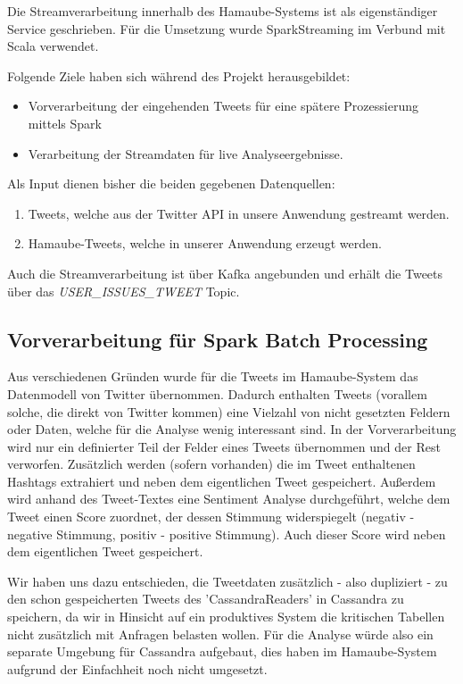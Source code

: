 Die Streamverarbeitung innerhalb des Hamaube-Systems ist als eigenständiger Service geschrieben. Für die Umsetzung wurde SparkStreaming im Verbund mit Scala verwendet.

Folgende Ziele haben sich während des Projekt herausgebildet:
\begin{itemize}
	\item Vorverarbeitung der eingehenden Tweets für eine spätere Prozessierung mittels Spark
	\item Verarbeitung der Streamdaten für live Analyseergebnisse.
\end{itemize}


Als Input dienen bisher die beiden gegebenen Datenquellen:
\begin{enumerate}
	\item Tweets, welche aus der Twitter API in unsere Anwendung gestreamt werden.
	\item Hamaube-Tweets, welche in unserer Anwendung erzeugt werden.
\end{enumerate}

Auch die Streamverarbeitung ist über Kafka angebunden und erhält die Tweets über das \textit{USER\_ISSUES\_TWEET} Topic.


\subsection*{Vorverarbeitung für Spark Batch Processing}
Aus verschiedenen Gründen wurde für die Tweets im Hamaube-System das Datenmodell von Twitter übernommen.
Dadurch enthalten Tweets (vorallem solche, die direkt von Twitter kommen) eine Vielzahl von nicht gesetzten Feldern oder Daten, welche für die Analyse wenig interessant sind.
In der Vorverarbeitung wird nur ein definierter Teil der Felder eines Tweets übernommen und der Rest verworfen.
Zusätzlich werden (sofern vorhanden) die im Tweet enthaltenen Hashtags extrahiert und neben dem eigentlichen Tweet gespeichert.
Außerdem wird anhand des Tweet-Textes eine Sentiment Analyse durchgeführt, welche dem Tweet einen Score zuordnet, der dessen Stimmung widerspiegelt (negativ - negative Stimmung, positiv - positive Stimmung). Auch dieser Score wird neben dem eigentlichen Tweet gespeichert.

Wir haben uns dazu entschieden, die Tweetdaten zusätzlich - also dupliziert - zu den schon gespeicherten Tweets des 'CassandraReaders' in Cassandra zu speichern, da wir in Hinsicht auf ein produktives System die kritischen Tabellen nicht zusätzlich mit Anfragen belasten wollen.
Für die Analyse würde also ein separate Umgebung für Cassandra aufgebaut, dies haben im Hamaube-System aufgrund der Einfachheit noch nicht umgesetzt.

